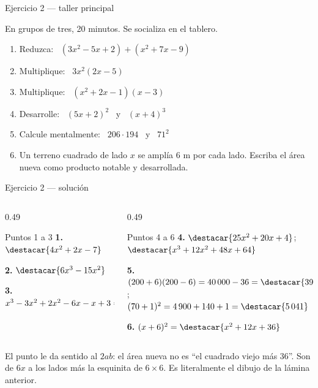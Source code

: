 \documentclass[aspectratio=169,10pt]{beamer}
\begin{document}
\begin{frame}{Ejercicio 2 — taller principal}
  \begin{alertblock}{En grupos de tres, 20 minutos. Se socializa en el tablero.}
    \scriptsize
    \begin{enumerate}\setlength{\itemsep}{0.0cm}
      \item Reduzca: \ $(3x^{2}-5x+2)+(x^{2}+7x-9)$
      \item Multiplique: \ $3x^{2}(2x-5)$
      \item Multiplique: \ $(x^{2}+2x-1)(x-3)$
      \item Desarrolle: \ $(5x+2)^{2}$ \ y \ $(x+4)^{3}$
      \item Calcule mentalmente: \ $206\cdot 194$ \ y \ $71^{2}$
      \item Un terreno cuadrado de lado $x$ se amplía $6$ m por cada lado.
            Escriba el área nueva como producto notable y desarrollada.
    \end{enumerate}
  \end{alertblock}
\end{frame}

\begin{frame}{Ejercicio 2 — solución}
  \scriptsize
  \begin{columns}[T,onlytextwidth]
    \begin{column}{0.49\textwidth}
      \begin{block}{Puntos 1 a 3}
        \tiny
        \textbf{1.} $\destacar{4x^{2}+2x-7}$

        \vspace{0.08cm}
        \textbf{2.} $\destacar{6x^{3}-15x^{2}}$

        \vspace{0.08cm}
        \textbf{3.} $x^{3}-3x^{2}+2x^{2}-6x-x+3
        = \destacar{x^{3}-x^{2}-7x+3}$
      \end{block}
    \end{column}
    \begin{column}{0.49\textwidth}
      \begin{block}{Puntos 4 a 6}
        \tiny
        \textbf{4.} $\destacar{25x^{2}+20x+4}$; \
        $\destacar{x^{3}+12x^{2}+48x+64}$

        \vspace{0.08cm}
        \textbf{5.} $(200+6)(200-6)=40\,000-36
        =\destacar{39\,964}$; \
        $(70+1)^{2}=4\,900+140+1=\destacar{5\,041}$

        \vspace{0.08cm}
        \textbf{6.} $(x+6)^{2}
        = \destacar{x^{2}+12x+36}$
      \end{block}
    \end{column}
  \end{columns}

  \vspace{0.08cm}
  {\tiny\color{uniGris} El punto  le da sentido al $2ab$: el área
  nueva no es ``el cuadrado viejo más $36$''. Son  de
  $6x$ a los lados más la esquinita de $6\times 6$. Es literalmente el dibujo
  de la lámina anterior.}
\end{frame}
\end{document}
